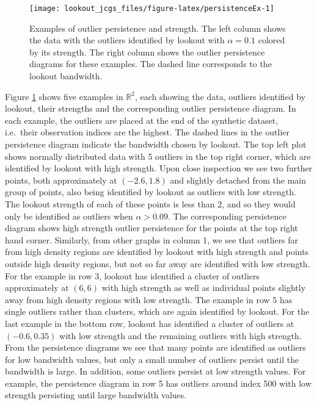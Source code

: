 \documentclass[12pt]{article}
\theoremstyle{definition}
\theoremstyle{definition}
\theoremstyle{definition}
\theoremstyle{definition}
\theoremstyle{remark}
\begin{document}
\begin{figure}
\texttt{[image: lookout\_jcgs\_files/figure-latex/persistenceEx-1]} \caption{Examples of outlier persistence and strength. The left column shows the data with the outliers identified by lookout with $\alpha = 0.1$ colored by its strength. The right column shows the outlier persistence diagrams for these examples. The dashed line corresponds to the lookout bandwidth.}\label{fig:persistenceEx}
\end{figure}

Figure \ref{fig:persistenceEx} shows five examples in \(\mathbb{R}^2\), each showing the data, outliers identified by lookout, their strengths and the corresponding outlier persistence diagram. In each example, the outliers are placed at the end of the synthetic dataset, i.e.~their observation indices are the highest. The dashed lines in the outlier persistence diagram indicate the bandwidth chosen by lookout. The top left plot shows normally distributed data with 5 outliers in the top right corner, which are identified by lookout with high strength. Upon close inspection we see two further points, both approximately at \((-2.6, 1.8)\) and slightly detached from the main group of points, also being identified by lookout as outliers with low strength. The lookout strength of each of these points is less than 2, and so they would only be identified as outliers when \(\alpha > 0.09\). The corresponding persistence diagram shows high strength outlier persistence for the points at the top right hand corner. Similarly, from other graphs in column 1, we see that outliers far from high density regions are identified by lookout with high strength and points outside high density regions, but not so far away are identified with low strength. For the example in row 3, lookout has identified a cluster of outliers approximately at \((6,6)\) with high strength as well as individual points slightly away from high density regions with low strength. The example in row 5 has single outliers rather than clusters, which are again identified by lookout. For the last example in the bottom row, lookout has identified a cluster of outliers at \((-0.6, 0.35)\) with low strength and the remaining outliers with high strength. From the persistence diagrams we see that many points are identified as outliers for low bandwidth values, but only a small number of outliers persist until the bandwidth is large. In addition, some outliers persist at low strength values. For example, the persistence diagram in row 5 has outliers around index 500 with low strength persisting until large bandwidth values.
\end{document}
